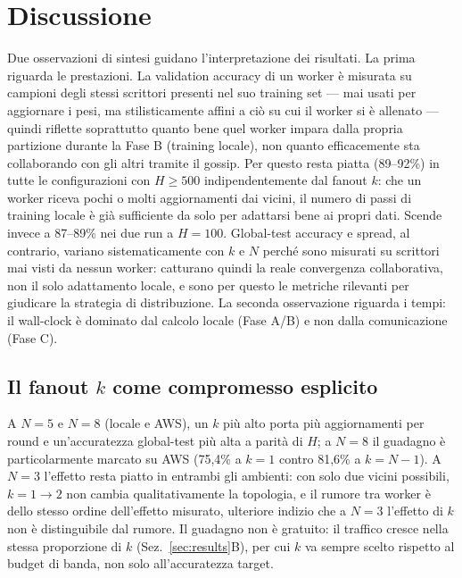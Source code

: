 \section{Discussione}
\label{sec:discussion}

Due osservazioni di sintesi guidano l'interpretazione dei risultati. La prima
riguarda le prestazioni. La validation accuracy di un worker è misurata su
campioni degli stessi scrittori presenti nel suo training set — mai usati
per aggiornare i pesi, ma stilisticamente affini a ciò su cui il worker si è
allenato — quindi riflette soprattutto quanto bene quel worker impara dalla
propria partizione durante la Fase B (training locale), non quanto
efficacemente sta collaborando con gli altri tramite il gossip. Per questo
resta piatta (89--92\%) in tutte le configurazioni con $H\ge500$
indipendentemente dal fanout $k$: che un worker riceva pochi o molti
aggiornamenti dai vicini, il numero di passi di training locale è già
sufficiente da solo per adattarsi bene ai propri dati. Scende invece a
87--89\% nei due run a $H=100$. Global-test
accuracy e spread, al contrario, variano sistematicamente con $k$ e $N$
perché sono misurati su scrittori mai visti da nessun worker: catturano
quindi la reale convergenza collaborativa, non il solo adattamento locale, e
sono per questo le metriche rilevanti per giudicare la strategia di
distribuzione. La seconda osservazione riguarda i
tempi: il wall-clock è dominato dal calcolo locale (Fase A/B) e non dalla
comunicazione (Fase C).

\subsection{Il fanout $k$ come compromesso esplicito}
A $N=5$ e $N=8$ (locale e AWS), un $k$ più alto porta più aggiornamenti per
round e un'accuratezza global-test più alta a parità di $H$; a $N=8$ il guadagno è particolarmente marcato su AWS (75,4\%
a $k=1$ contro 81,6\% a $k=N-1$). A $N=3$ l'effetto resta piatto in entrambi
gli ambienti: con solo due vicini possibili, $k=1\to2$ non cambia
qualitativamente la topologia, e il rumore tra worker
è dello stesso ordine dell'effetto misurato,
ulteriore indizio che a $N=3$ l'effetto di $k$ non è distinguibile dal
rumore. Il guadagno non è gratuito: il
traffico cresce nella stessa proporzione di $k$ (Sez.~\ref{sec:results}B),
per cui $k$ va sempre scelto rispetto al budget di banda, non solo
all'accuratezza target.

